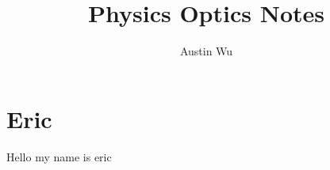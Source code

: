\documentclass{report}
\title{Physics Optics Notes}
\author{Austin Wu}
\date{}
\begin{document}
    \maketitle
    \newpage
    \tableofcontents \pagebreak 
    \chapter{Eric}
    Hello my name is eric 
\end{document}

